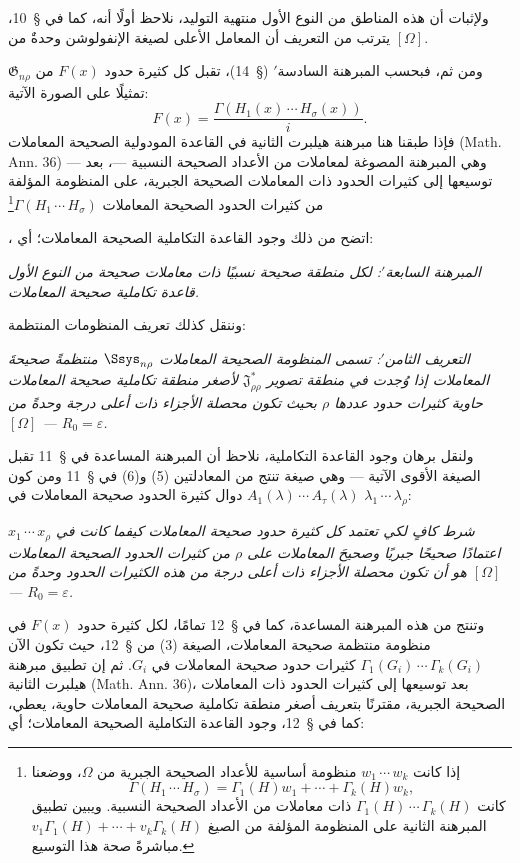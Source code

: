 \documentclass[11pt]{article}
\newcommand{\srcLTR}[1]{\relax\ifmmode\text{\mbox{\babelsublr{\foreignlanguage{english}{#1}}}}\else\babelsublr{\foreignlanguage{english}{#1}}\fi}
\newcommand{\srcfn}[2]{\begingroup\renewcommand{\thefootnote}{\srcLTR{#1}}\footnote{#2}\addtocounter{footnote}{-1}\endgroup}
\providecommand{\Jdom}{\mathfrak{J}}
\providecommand{\Gdom}{\mathfrak{G}}
\providecommand{\rcdots}{\,\cdots\,}
\providecommand{\eps}{\varepsilon}
\begin{document}
ولإثبات أن هذه المناطق من النوع الأول منتهية التوليد، نلاحظ أولًا أنه، كما في \S\ 10، يترتب من التعريف أن المعامل الأعلى لصيغة الإنفولوشن وحدةٌ من $[\Omega]$.

ومن ثم، فبحسب المبرهنة السادسة$'$ (\S\ 14)، تقبل كل كثيرة حدود $F(x)$ من $\Gdom_{n\rho}$ تمثيلًا على الصورة الآتية:
\[
  F(x)=\frac{\Gamma(H_1(x)\rcdots H_\sigma(x))}{i}.
\]
فإذا طبقنا هنا مبرهنة هيلبرت الثانية في القاعدة المودولية الصحيحة المعاملات (Math. Ann. 36) --- وهي المبرهنة المصوغة لمعاملات من الأعداد الصحيحة النسبية ---، بعد توسيعها إلى كثيرات الحدود ذات المعاملات الصحيحة الجبرية، على المنظومة المؤلفة من كثيرات الحدود الصحيحة المعاملات $\Gamma(H_1\rcdots H_\sigma)$\srcfn{*)}{إذا كانت $w_1\rcdots w_k$ منظومة أساسية للأعداد الصحيحة الجبرية من $\Omega$، ووضعنا
\[
  \Gamma(H_1\rcdots H_\sigma)=\Gamma_1(H)w_1+\cdots+\Gamma_k(H)w_k,
\]
كانت $\Gamma_1(H)\rcdots \Gamma_k(H)$ ذات معاملات من الأعداد الصحيحة النسبية. ويبين تطبيق المبرهنة الثانية على المنظومة المؤلفة من الصيغ $v_1\Gamma_1(H)+\cdots+v_k\Gamma_k(H)$ مباشرةً صحة هذا التوسيع.}، اتضح من ذلك وجود القاعدة التكاملية الصحيحة المعاملات؛ أي:

\emph{المبرهنة السابعة$'$: لكل منطقة صحيحة نسبيًا ذات معاملات صحيحة من النوع الأول قاعدة تكاملية صحيحة المعاملات.}

وننقل كذلك تعريف المنظومات المنتظمة:

\emph{التعريف الثامن$'$: تسمى المنظومة الصحيحة المعاملات $\Ssys_{n\rho}$ منتظمةً صحيحةَ المعاملات إذا وُجدت في منطقة تصوير $\Jdom^*_{\rho\rho}$ لأصغر منطقة تكاملية صحيحة المعاملات حاوية كثيرات حدود عددها $\rho$ بحيث تكون محصلة الأجزاء ذات أعلى درجة وحدةً من $[\Omega]$ --- $R_0=\eps$.}

ولنقل برهان وجود القاعدة التكاملية، نلاحظ أن المبرهنة المساعدة في \S\ 11 تقبل الصيغة الأقوى الآتية --- وهي صيغة تنتج من المعادلتين (5) و(6) في \S\ 11 ومن كون $A_1(\lambda)\rcdots A_\tau(\lambda)$ دوال كثيرة الحدود صحيحة المعاملات في $\lambda_1\rcdots\lambda_\rho$:

\emph{شرط كافٍ لكي تعتمد كل كثيرة حدود صحيحة المعاملات كيفما كانت في $x_1\rcdots x_\rho$ اعتمادًا صحيحًا جبريًا وصحيحَ المعاملات على $\rho$ من كثيرات الحدود الصحيحة المعاملات هو أن تكون محصلة الأجزاء ذات أعلى درجة من هذه الكثيرات الحدود وحدةً من $[\Omega]$ --- $R_0=\eps$.}

وتنتج من هذه المبرهنة المساعدة، كما في \S\ 12 تمامًا، لكل كثيرة حدود $F(x)$ في منظومة منتظمة صحيحة المعاملات، الصيغة (3) من \S\ 12، حيث تكون الآن $\Gamma_1(G_i)\rcdots\Gamma_k(G_i)$ كثيرات حدود صحيحة المعاملات في $G_i$. ثم إن تطبيق مبرهنة هيلبرت الثانية (Math. Ann. 36)، بعد توسيعها إلى كثيرات الحدود ذات المعاملات الصحيحة الجبرية، مقترنًا بتعريف أصغر منطقة تكاملية صحيحة المعاملات حاوية، يعطي، كما في \S\ 12، وجود القاعدة التكاملية الصحيحة المعاملات؛ أي:
\end{document}
